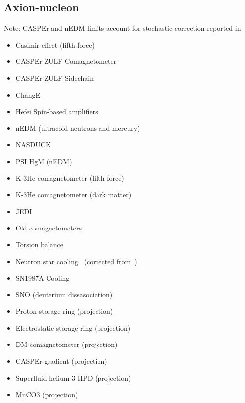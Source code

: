 \documentclass[8pt,twocolumn]{extarticle}
\begin{document}
\begin{mdframed}
\vspace{-1em}
\section{Axion-nucleon}\vspace{-0.5em}
Note: CASPEr and nEDM limits account for stochastic correction reported in~\cite{Centers:2019dyn}
\begin{itemize}\setlength\itemsep{-0.5em}
	\item Casimir effect (fifth force)~\cite{Mostepanenko:2020lqe}
    \item CASPEr-ZULF-Comagnetometer~\cite{Wu:2019exd}
    \item CASPEr-ZULF-Sidechain~\cite{Garcon:2019inh}
   \item ChangE~\cite{Wei:2023rzs,Xu:2023}
   \item Hefei Spin-based amplifiers~\cite{Jiang:2021dby}
    \item nEDM (ultracold neutrons and mercury)~\cite{Abel:2017rtm}
    \item NASDUCK~\cite{Bloch:2021vnn,Bloch:2022kjm}
    \item PSI HgM (nEDM)~\cite{Abel:2022vfg}
    \item K-3He comagnetometer (fifth force)~\cite{Vasilakis2009}
    \item K-3He comagnetometer (dark matter)~\cite{Lee:2022vvb}
    	\item JEDI~\cite{JEDI:2022hxa}
    \item Old comagnetometers~\cite{Bloch:2019lcy}
    \item Torsion balance~\cite{Adelberger:2006dh}
    \item Neutron star cooling~\cite{Buschmann:2021juv} (corrected from~\cite{Beznogov:2018fda})
    \item SN1987A Cooling~\cite{Carenza:2019pxu,Lella:2023bfb}
    \item SNO (deuterium dissasociation)~\cite{Bhusal:2020bvx}
    \item Proton storage ring (projection)~\cite{Graham:2020kai}
    \item Electrostatic storage ring (projection)~\cite{Brandenstein:2022eif}
    \item DM comagnetometer (projection)~\cite{Bloch:2019lcy}
    \item CASPEr-gradient (projection)~\cite{Garcon:2019inh}
    \item Superfluid helium-3 HPD (projection)~\cite{Gao:2022nuq}
    \item MnCO3 (projection)~\cite{Chigusa:2023hmz}
\end{itemize}
\end{mdframed}
\end{document}
